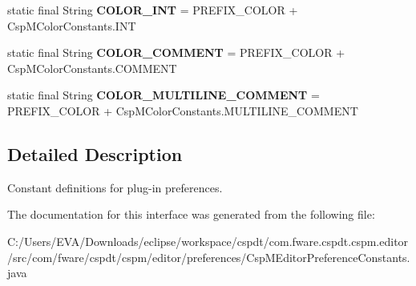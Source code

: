\begin{DoxyCompactItemize}
\item 
\mbox{\label{interfacecom_1_1fware_1_1cspdt_1_1cspm_1_1editor_1_1preferences_1_1_csp_m_editor_preference_constants_a13ddcd1a11f931db98c46e0b3db21e0a}} 
static final String {\bfseries C\+O\+L\+O\+R\+\_\+\+I\+NT} = P\+R\+E\+F\+I\+X\+\_\+\+C\+O\+L\+OR + Csp\+M\+Color\+Constants.\+I\+NT
\item 
\mbox{\label{interfacecom_1_1fware_1_1cspdt_1_1cspm_1_1editor_1_1preferences_1_1_csp_m_editor_preference_constants_a93076e28b047fef9f5b1aa05c233bc47}} 
static final String {\bfseries C\+O\+L\+O\+R\+\_\+\+C\+O\+M\+M\+E\+NT} = P\+R\+E\+F\+I\+X\+\_\+\+C\+O\+L\+OR + Csp\+M\+Color\+Constants.\+C\+O\+M\+M\+E\+NT
\item 
\mbox{\label{interfacecom_1_1fware_1_1cspdt_1_1cspm_1_1editor_1_1preferences_1_1_csp_m_editor_preference_constants_af5c4dc5dbf31165f7ec6480a88bb8145}} 
static final String {\bfseries C\+O\+L\+O\+R\+\_\+\+M\+U\+L\+T\+I\+L\+I\+N\+E\+\_\+\+C\+O\+M\+M\+E\+NT} = P\+R\+E\+F\+I\+X\+\_\+\+C\+O\+L\+OR + Csp\+M\+Color\+Constants.\+M\+U\+L\+T\+I\+L\+I\+N\+E\+\_\+\+C\+O\+M\+M\+E\+NT
\end{DoxyCompactItemize}


\subsection{Detailed Description}
Constant definitions for plug-\/in preferences. 

The documentation for this interface was generated from the following file\+:\begin{DoxyCompactItemize}
\item 
C\+:/\+Users/\+E\+V\+A/\+Downloads/eclipse/workspace/cspdt/com.\+fware.\+cspdt.\+cspm.\+editor/src/com/fware/cspdt/cspm/editor/preferences/Csp\+M\+Editor\+Preference\+Constants.\+java\end{DoxyCompactItemize}
